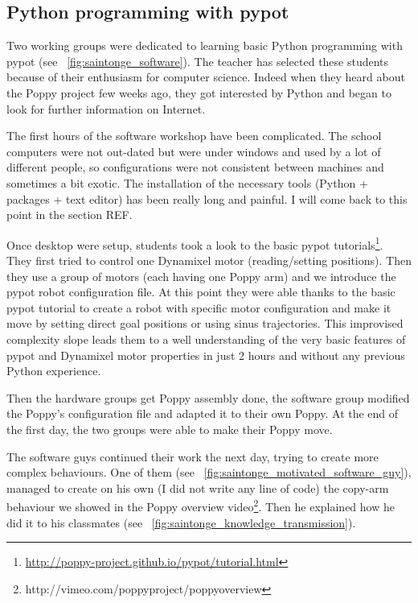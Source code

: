 \subsection{Python programming with pypot}

Two working groups were dedicated to learning basic Python programming with pypot (see \figurename~\ref{fig:saintonge_software}). The teacher has selected these students because of their enthusiasm for computer science. Indeed when they heard about the Poppy project few weeks ago, they got interested by Python and began to look for further information on Internet.

The first hours of the software workshop have been complicated. The school computers were not out-dated but were under windows and used by a lot of different people, so configurations were not consistent between machines and sometimes a bit exotic. The installation of the necessary tools (Python + packages + text editor) has been really long and painful. I will come back to this point in the section REF.

Once desktop were setup, students took a look to the basic pypot tutorials\footnote{\url{http://poppy-project.github.io/pypot/tutorial.html}}. They first tried to control one Dynamixel motor (reading/setting positions). Then they use a group of motors (each having one Poppy arm) and we introduce the pypot robot configuration file. At this point they were able thanks to the basic pypot tutorial to create a robot with specific motor configuration and make it move by setting direct goal positions or using sinus trajectories. This improvised complexity slope leads them to a well understanding of the very basic features of pypot and Dynamixel motor properties in just 2 hours and without any previous Python experience.

Then the hardware groups get Poppy assembly done, the software group modified the Poppy's configuration file and adapted it to their own Poppy. At the end of the first day, the two groups were able to make their Poppy move.

The software guys continued their work the next day, trying to create more complex behaviours. One of them (see \figurename~\ref{fig:saintonge_motivated_software_guy}), managed to create on his own (I did not write any line of code) the copy-arm behaviour we showed in the Poppy overview video\footnote{http://vimeo.com/poppyproject/poppyoverview}. Then he explained how he did it to his classmates (see \figurename~\ref{fig:saintonge_knowledge_transmission}).

